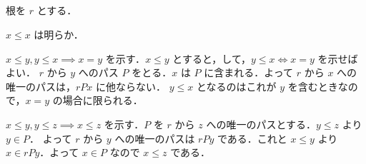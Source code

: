 \subsection{}
根を $r$ とする．

$x\leq x$ は明らか．

$x\leq y, y\leq x\implies x = y$ を示す．$x\leq y$ とすると，して，$y\leq x\iff x = y$ を示せばよい．
$r$ から $y$ へのパス $P$ をとる．$x$ は $P$ に含まれる．よって $r$ から $x$ への唯一のパスは，$rPx$ に他ならない．
$y\leq x$ となるのはこれが $y$ を含むときなので，$x=y$ の場合に限られる．

$x\leq y, y\leq z \implies x\leq z$ を示す．$P$ を $r$ から $z$ への唯一のパスとする．$y\leq z$ より $y\in P$．
よって $r$ から $y$ への唯一のパスは $rPy$ である．これと $x\leq y$ より $x\in rPy$．よって $x\in P$ なので $x\leq z$ である．

